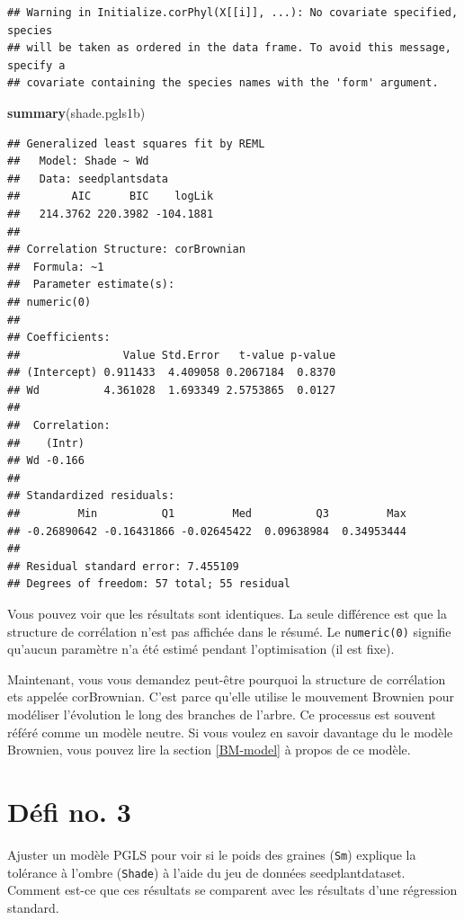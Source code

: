 \documentclass[
]{book}
\newenvironment{Shaded}{\begin{snugshade}}{\end{snugshade}}
\newcommand{\FunctionTok}[1]{\textcolor[rgb]{0.13,0.29,0.53}{\textbf{#1}}}
\newcommand{\NormalTok}[1]{#1}
\begin{document}
\begin{verbatim}
## Warning in Initialize.corPhyl(X[[i]], ...): No covariate specified, species
## will be taken as ordered in the data frame. To avoid this message, specify a
## covariate containing the species names with the 'form' argument.
\end{verbatim}

\begin{Shaded}
\begin{Highlighting}[]
\FunctionTok{summary}\NormalTok{(shade.pgls1b)}
\end{Highlighting}
\end{Shaded}

\begin{verbatim}
## Generalized least squares fit by REML
##   Model: Shade ~ Wd 
##   Data: seedplantsdata 
##        AIC      BIC    logLik
##   214.3762 220.3982 -104.1881
## 
## Correlation Structure: corBrownian
##  Formula: ~1 
##  Parameter estimate(s):
## numeric(0)
## 
## Coefficients:
##                Value Std.Error   t-value p-value
## (Intercept) 0.911433  4.409058 0.2067184  0.8370
## Wd          4.361028  1.693349 2.5753865  0.0127
## 
##  Correlation: 
##    (Intr)
## Wd -0.166
## 
## Standardized residuals:
##         Min          Q1         Med          Q3         Max 
## -0.26890642 -0.16431866 -0.02645422  0.09638984  0.34953444 
## 
## Residual standard error: 7.455109 
## Degrees of freedom: 57 total; 55 residual
\end{verbatim}

Vous pouvez voir que les résultats sont identiques. La seule différence est que la structure de corrélation n'est pas affichée dans le résumé. Le \texttt{numeric(0)} signifie qu'aucun paramètre n'a été estimé pendant l'optimisation (il est fixe).

Maintenant, vous vous demandez peut-être pourquoi la structure de corrélation ets appelée corBrownian. C'est parce qu'elle utilise le mouvement Brownien pour modéliser l'évolution le long des branches de l'arbre. Ce processus est souvent référé comme un modèle neutre. Si vous voulez en savoir davantage du le modèle Brownien, vous pouvez lire la section \ref{BM-model} à propos de ce modèle.

\section{Défi no. 3}\label{duxe9fi-no.-3}

Ajuster un modèle PGLS pour voir si le poids des graines (\texttt{Sm}) explique la tolérance à l'ombre (\texttt{Shade}) à l'aide du jeu de données seedplantdataset. Comment est-ce que ces résultats se comparent avec les résultats d'une régression standard.
\end{document}
